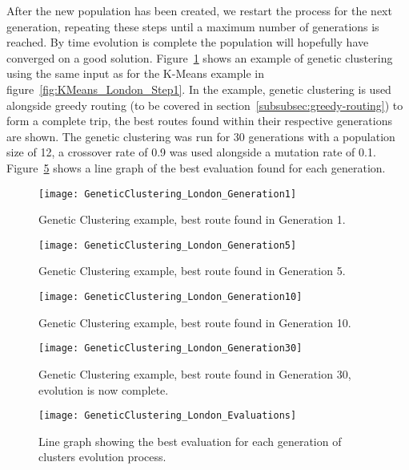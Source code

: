 \noindent
After the new population has been created, we restart the process for the next generation, repeating these steps
until a maximum number of generations is reached.
By time evolution is complete the population will hopefully have converged on a good solution.
Figure~\ref{fig:GeneticClustering_London_Generation1} shows an example of genetic clustering using the same input as for the
K-Means example in figure~\ref{fig:KMeans_London_Step1}.
In the example, genetic clustering is used alongside greedy routing (to be covered in section~\ref{subsubsec:greedy-routing})
to form a complete trip, the best routes found within their respective generations are shown.
The genetic clustering was run for 30 generations with a population size of 12, a crossover rate of 0.9 was used
alongside a mutation rate of 0.1.
Figure~\ref{fig:GeneticClustering_London_Evaluations} shows a line graph of the best evaluation found for each
generation.
\begin{figure}[H]
    \ContinuedFloat*
    \centering
    \texttt{[image: GeneticClustering\_London\_Generation1]}
    \caption{Genetic Clustering example, best route found in Generation 1.}
    \label{fig:GeneticClustering_London_Generation1}
\end{figure}
\begin{figure}[H]
    \ContinuedFloat
    \centering
    \texttt{[image: GeneticClustering\_London\_Generation5]}
    \caption{Genetic Clustering example, best route found in Generation 5.}
    \label{fig:GeneticClustering_London_Generation2}
\end{figure}
\begin{figure}[H]
    \ContinuedFloat
    \centering
    \texttt{[image: GeneticClustering\_London\_Generation10]}
    \caption{Genetic Clustering example, best route found in Generation 10.}
    \label{fig:GeneticClustering_London_Generation10}
\end{figure}
\begin{figure}[H]
    \ContinuedFloat
    \centering
    \texttt{[image: GeneticClustering\_London\_Generation30]}
    \caption{Genetic Clustering example, best route found in Generation 30, evolution is now complete.}
    \label{fig:GeneticClustering_London_Generation30}
\end{figure}
\begin{figure}[H]
    \centering
    \texttt{[image: GeneticClustering\_London\_Evaluations]}
    \caption{Line graph showing the best evaluation for each generation of clusters evolution process.}
    \label{fig:GeneticClustering_London_Evaluations}
\end{figure}
\noindent


